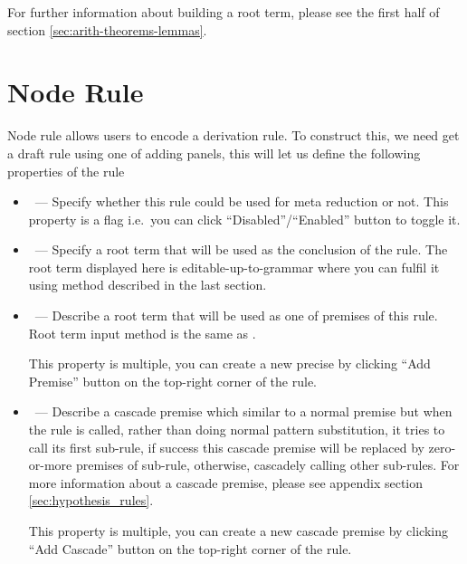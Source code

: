 \documentclass[master.tex]{subfiles}
\begin{document}
For further information about building a root term, please see the first half of
section \ref{sec:arith-theorems-lemmas}.

\section{Node Rule}
\label{spec:node_rule}

Node rule allows users to encode a derivation rule. To construct this, we need
get a draft rule using one of adding panels, this will let us define the
following properties of the rule

\begin{itemize}
\item \kAllowReduction\ --- Specify whether this rule could be used for meta
  reduction or not. This property is a flag i.e.\ you can click
  ``Disabled''/``Enabled'' button to toggle it.
\item \kConclusion\ --- Specify a root term that will be used as the conclusion
  of the rule. The root term displayed here is editable-up-to-grammar where you
  can fulfil it using method described in the last section.
\item \kPremise\ --- Describe a root term that will be used as one of premises
  of this rule. Root term input method is the same as \kConclusion{}.

  This property is multiple, you can create a new precise by clicking ``Add
  Premise'' button on the top-right corner of the rule.
\item \kCascade\ --- Describe a cascade premise which similar to a normal
  premise but when the rule is called, rather than doing normal pattern
  substitution, it tries to call its first sub-rule, if success this cascade
  premise will be replaced by zero-or-more premises of sub-rule, otherwise,
  cascadely calling other sub-rules. For more information about a cascade
  premise, please see appendix section \ref{sec:hypothesis_rules}.

  This property is multiple, you can create a new cascade premise by clicking
  ``Add Cascade'' button on the top-right corner of the rule.


\end{itemize}
\end{document}
